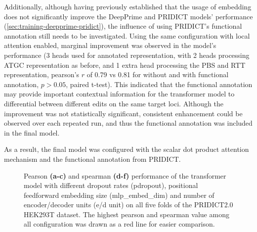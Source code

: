 Additionally, although having previously established that the usage of embedding does not significantly improve the DeepPrime and PRIDICT models' performance (\autoref{sec:training-deepprime-pridict}), the influence of using PRIDICT's functional annotation still needs to be investigated. Using the same configuration with local attention enabled, marginal improvement was observed in the model's performance (3 heads used for annotated representation, with 2 heads processing ATGC representation as before, and 1 extra head processing the PBS and RTT representation, pearson's $r$ of 0.79 vs 0.81 for without and with functional annotation, $p>0.05$, paired t-test). This indicated that the functional annotation may provide important contextual information for the transformer model to differential between different edits on the same target loci. Although the improvement was not statistically significant, consistent enhancement could be observed over each repeated run, and thus the functional annotation was included in the final model.

As a result, the final model was configured with the scalar dot product attention mechanism and the functional annotation from PRIDICT.

\begin{figure}
    \caption[Transformer Model Hyperparameter Tuning]{Pearson \textbf{(a-c)} and spearman \textbf{(d-f)} performance of the transformer model with different dropout rates (pdropout), positional feedforward embedding size (mlp\_embed\_dim) and number of encoder/decoder units (e/d unit) on all five folds of the PRIDICT2.0 HEK293T dataset. The highest pearson and spearman value among all configuration was drawn as a red line for easier comparison.}
    \label{fig:transformer-tune}
\end{figure}

